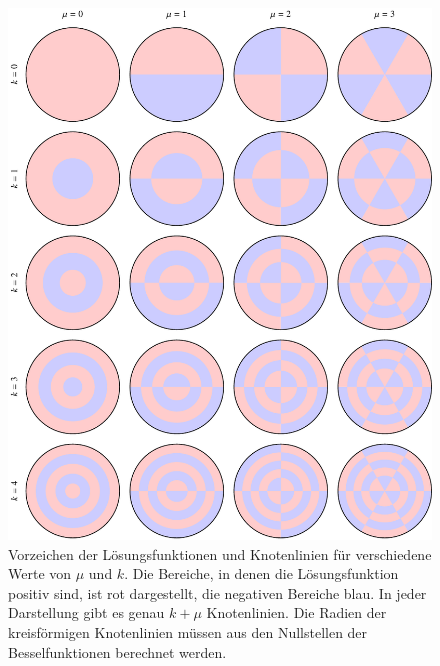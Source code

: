 \begin{figure}
\centering
\includegraphics[width=\textwidth]{chapters/090-pde/bessel/pauke.pdf}
\caption{Vorzeichen der Lösungsfunktionen und Knotenlinien
für verschiedene Werte von $\mu$ und $k$.
Die Bereiche, in denen die Lösungsfunktion positiv sind, ist 
rot dargestellt, die negativen Bereiche blau.
In jeder Darstellung gibt es genau $k+\mu$ Knotenlinien.
Die Radien der kreisförmigen Knotenlinien müssen aus den Nullstellen
der Besselfunktionen berechnet werden.
\label{buch:pde:kreis:fig:pauke}}
\end{figure}
